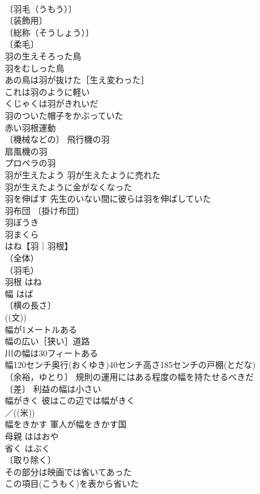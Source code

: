 \documentclass[8pt]{extreport}
\begin{document}
\begin{CJK}{UTF8}{min}
\\	〔羽毛（うもう）〕
\\	〔装飾用〕
\\	〔総称（そうしょう）〕
\\	〔柔毛〕
\\	羽の生えそろった鳥 
\\	羽をむしった鳥 
\\	あの鳥は羽が抜けた［生え変わった］ 
\\	これは羽のように軽い 
\\	くじゃくは羽がきれいだ 
\\	羽のついた帽子をかぶっていた 
\\	赤い羽根運動 
\\	〔機械などの〕 飛行機の羽 
\\	扇風機の羽 
\\	プロペラの羽 
\\	羽が生えたよう 羽が生えたように売れた 
\\	羽が生えたように金がなくなった 
\\	羽を伸ばす 先生のいない間に彼らは羽を伸ばしていた 
\\	羽布団 〔掛け布団〕
\\	羽ぼうき 
\\	羽まくら 
\\	はね【羽｜羽根】 
\\	（全体）
\\	（羽毛）
\\	羽根	はね	
\\	幅	はば	
\\	〔横の長さ〕
\\	((文)) 
\\	幅が1メートルある 
\\	幅の広い［狭い］道路 
\\	川の幅は30フィートある 
\\	幅120センチ奥行(おくゆき)40センチ高さ185センチの戸棚(とだな) 
\\	〔余裕，ゆとり〕 規則の運用にはある程度の幅を持たせるべきだ 
\\	〔差〕 利益の幅は小さい 
\\	幅がきく 彼はこの辺では幅がきく 
\\	／((米)) 
\\	幅をきかす 軍人が幅をきかす国 
\\	母親	ははおや	
\\	省く	はぶく	
\\	〔取り除く〕
\\	その部分は映画では省いてあった 
\\	この項目(こうもく)を表から省いた 

\end{CJK}
\end{document}
